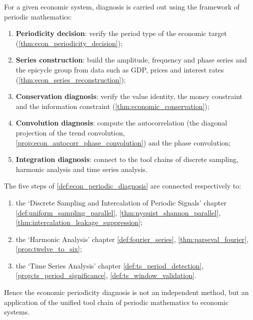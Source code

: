 \begin{definition}\label{def:econ_periodic_diagnosis}
For a given economic system, diagnosis is carried out using the framework of periodic mathematics:
\begin{enumerate}[label=(\roman*)]
    \item \textbf{Periodicity decision}: verify the period type of the economic target (\cref{thm:econ_periodicity_decision});
    \item \textbf{Series construction}: build the amplitude, frequency and phase series and the epicycle group from data such as GDP, prices and interest rates (\cref{thm:econ_series_reconstruction});
    \item \textbf{Conservation diagnosis}: verify the value identity, the money constraint and the information constraint (\cref{thm:economic_conservation});
    \item \textbf{Convolution diagnosis}: compute the autocorrelation (the diagonal projection of the trend convolution, \cref{prop:econ_autocorr_phase_convolution}) and the phase convolution;
    \item \textbf{Integration diagnosis}: connect to the tool chains of discrete sampling, harmonic analysis and time series analysis.
\end{enumerate}
\end{definition}

\begin{theorem}\label{thm:econ_diagnosis_integration}
The five steps of \cref{def:econ_periodic_diagnosis} are connected respectively to:
\begin{enumerate}[label=(\roman*)]
    \item the `Discrete Sampling and Intercalation of Periodic Signals' chapter \cref{def:uniform_sampling_parallel}, \cref{thm:nyquist_shannon_parallel}, \cref{thm:intercalation_leakage_suppression};
    \item the `Harmonic Analysis' chapter \cref{def:fourier_series}, \cref{thm:parseval_fourier}, \cref{prop:twelve_to_six};
    \item the `Time Series Analysis' chapter \cref{def:ts_period_detection}, \cref{prop:ts_period_significance}, \cref{def:ts_window_validation}.
\end{enumerate}
Hence the economic periodicity diagnosis is not an independent method, but an application of the unified tool chain of periodic mathematics to economic systems.
\end{theorem}

